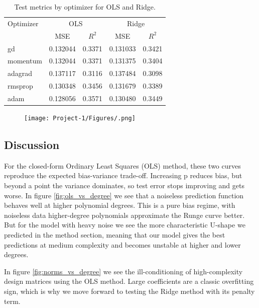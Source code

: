 \documentclass[amssymb,twocolumn,aps]{revtex4-2}
\begin{document}
\begin{table}[h!]
\caption{Test metrics by optimizer for OLS and Ridge.}
\label{tab:test-metrics-optimizers}
\begin{ruledtabular}
\begin{tabular}{lcccc}
Optimizer & \multicolumn{2}{c}{OLS} & \multicolumn{2}{c}{Ridge} \\
\colrule
 & MSE & $R^2$ & MSE & $R^2$ \\
\colrule
gd       & 0.132044 & 0.3371 & 0.131033 & 0.3421 \\
momentum & 0.132044 & 0.3371 & 0.131375 & 0.3404 \\
adagrad  & 0.137117 & 0.3116 & 0.137484 & 0.3098 \\
rmsprop  & 0.130348 & 0.3456 & 0.131679 & 0.3389 \\
adam     & 0.128056 & 0.3571 & 0.130480 & 0.3449 \\
\end{tabular}
\end{ruledtabular}
\end{table}


\begin{figure}[H]
    \centering
    \texttt{[image: Project-1/Figures/.png]}
    \caption{}
    \label{fig:}
\end{figure}

\subsection{Discussion}

For the closed-form Ordinary Least Squares (OLS) method, these two curves reproduce the expected bias-variance trade-off. Increasing p reduces bias, but beyond a point the variance dominates, so test error stops improving and gets worse. In figure \ref{fig:ols_vs_degree} we see that a noiseless prediction function behaves well at higher polynomial degrees. This is a pure bias regime, with noiseless data higher-degree polynomials approximate the Runge curve better. But for the model with heavy noise we see the more characteristic U-shape we predicted in the method section, meaning that our model gives the best predictions at medium complexity and becomes unstable at higher and lower degrees.

In figure \ref{fig:norms_vs_degree} we see the ill-conditioning of high-complexity design matrices using the OLS method. Large coefficients are a classic overfitting sign, which is why we move forward to testing the Ridge method with its penalty term. \\
\end{document}
